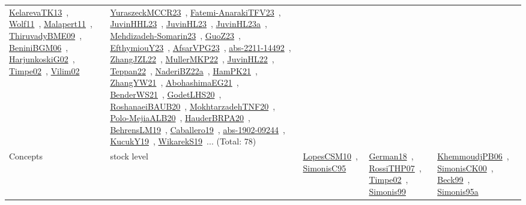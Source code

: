 {\begin{longtable}{lp{3cm}>{\raggedright\arraybackslash}p{6cm}>{\raggedright\arraybackslash}p{6cm}>{\raggedright\arraybackslash}p{8cm}}
\href{works/KelarevaTK13.pdf}{KelarevaTK13}~\cite{KelarevaTK13}, \href{works/Wolf11.pdf}{Wolf11}~\cite{Wolf11}, \href{works/Malapert11.pdf}{Malapert11}~\cite{Malapert11}, \href{works/ThiruvadyBME09.pdf}{ThiruvadyBME09}~\cite{ThiruvadyBME09}, \href{works/BeniniBGM06.pdf}{BeniniBGM06}~\cite{BeniniBGM06}, \href{works/HarjunkoskiG02.pdf}{HarjunkoskiG02}~\cite{HarjunkoskiG02}, \href{works/Timpe02.pdf}{Timpe02}~\cite{Timpe02}, \href{works/Vilim02.pdf}{Vilim02}~\cite{Vilim02} & \href{works/YuraszeckMCCR23.pdf}{YuraszeckMCCR23}~\cite{YuraszeckMCCR23}, \href{works/Fatemi-AnarakiTFV23.pdf}{Fatemi-AnarakiTFV23}~\cite{Fatemi-AnarakiTFV23}, \href{works/JuvinHHL23.pdf}{JuvinHHL23}~\cite{JuvinHHL23}, \href{works/JuvinHL23.pdf}{JuvinHL23}~\cite{JuvinHL23}, \href{works/JuvinHL23a.pdf}{JuvinHL23a}~\cite{JuvinHL23a}, \href{works/Mehdizadeh-Somarin23.pdf}{Mehdizadeh-Somarin23}~\cite{Mehdizadeh-Somarin23}, \href{works/GuoZ23.pdf}{GuoZ23}~\cite{GuoZ23}, \href{works/EfthymiouY23.pdf}{EfthymiouY23}~\cite{EfthymiouY23}, \href{works/AfsarVPG23.pdf}{AfsarVPG23}~\cite{AfsarVPG23}, \href{works/abs-2211-14492.pdf}{abs-2211-14492}~\cite{abs-2211-14492}, \href{works/ZhangJZL22.pdf}{ZhangJZL22}~\cite{ZhangJZL22}, \href{works/MullerMKP22.pdf}{MullerMKP22}~\cite{MullerMKP22}, \href{works/JuvinHL22.pdf}{JuvinHL22}~\cite{JuvinHL22}, \href{works/Teppan22.pdf}{Teppan22}~\cite{Teppan22}, \href{works/NaderiBZ22a.pdf}{NaderiBZ22a}~\cite{NaderiBZ22a}, \href{works/HamPK21.pdf}{HamPK21}~\cite{HamPK21}, \href{works/ZhangYW21.pdf}{ZhangYW21}~\cite{ZhangYW21}, \href{works/AbohashimaEG21.pdf}{AbohashimaEG21}~\cite{AbohashimaEG21}, \href{works/BenderWS21.pdf}{BenderWS21}~\cite{BenderWS21}, \href{works/GodetLHS20.pdf}{GodetLHS20}~\cite{GodetLHS20}, \href{works/RoshanaeiBAUB20.pdf}{RoshanaeiBAUB20}~\cite{RoshanaeiBAUB20}, \href{works/MokhtarzadehTNF20.pdf}{MokhtarzadehTNF20}~\cite{MokhtarzadehTNF20}, \href{works/Polo-MejiaALB20.pdf}{Polo-MejiaALB20}~\cite{Polo-MejiaALB20}, \href{works/HauderBRPA20.pdf}{HauderBRPA20}~\cite{HauderBRPA20}, \href{works/BehrensLM19.pdf}{BehrensLM19}~\cite{BehrensLM19}, \href{works/Caballero19.pdf}{Caballero19}~\cite{Caballero19}, \href{works/abs-1902-09244.pdf}{abs-1902-09244}~\cite{abs-1902-09244}, \href{works/KucukY19.pdf}{KucukY19}~\cite{KucukY19}, \href{works/WikarekS19.pdf}{WikarekS19}~\cite{WikarekS19}... (Total: 78)\\
Concepts & stock level & \href{works/LopesCSM10.pdf}{LopesCSM10}~\cite{LopesCSM10}, \href{works/SimonisC95.pdf}{SimonisC95}~\cite{SimonisC95} & \href{works/German18.pdf}{German18}~\cite{German18}, \href{works/RossiTHP07.pdf}{RossiTHP07}~\cite{RossiTHP07}, \href{works/Timpe02.pdf}{Timpe02}~\cite{Timpe02}, \href{works/Simonis99.pdf}{Simonis99}~\cite{Simonis99} & \href{works/KhemmoudjPB06.pdf}{KhemmoudjPB06}~\cite{KhemmoudjPB06}, \href{works/SimonisCK00.pdf}{SimonisCK00}~\cite{SimonisCK00}, \href{works/Beck99.pdf}{Beck99}~\cite{Beck99}, \href{works/Simonis95a.pdf}{Simonis95a}~\cite{Simonis95a}\\

\end{longtable}}

